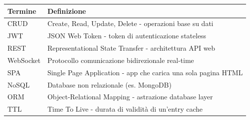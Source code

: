 \documentclass[12pt,a4paper]{report}
\begin{document}
\begin{table}[H]
    \centering
    \begin{tabular}{|l|p{9cm}|}
        \hline
        \textbf{Termine} & \textbf{Definizione} \\
        \hline
        CRUD & Create, Read, Update, Delete - operazioni base su dati \\
        \hline
        JWT & JSON Web Token - token di autenticazione stateless \\
        \hline
        REST & Representational State Transfer - architettura API web \\
        \hline
        WebSocket & Protocollo comunicazione bidirezionale real-time \\
        \hline
        SPA & Single Page Application - app che carica una sola pagina HTML \\
        \hline
        NoSQL & Database non relazionale (es. MongoDB) \\
        \hline
        ORM & Object-Relational Mapping - astrazione database layer \\
        \hline
        TTL & Time To Live - durata di validità di un'entry cache \\
        \hline
    \end{tabular}
\end{table}
\end{document}

